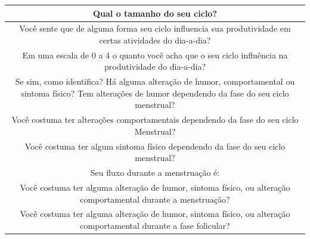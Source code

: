 \begin{table}[h]
\begin{tabular}{c}
        \midrule
        \begin{minipage} [t] {1\textwidth}  Qual o tamanho do seu ciclo? \end{minipage}\\
        \midrule
        \begin{minipage} [t] {1\textwidth}  Você sente que de alguma forma seu ciclo influencia sua produtividade em certas atividades do dia-a-dia? \end{minipage}\\
        \midrule
        \begin{minipage} [t] {1\textwidth}  Em uma escala de 0 a 4 o quanto você acha que o seu ciclo influência na produtividade do dia-a-dia? \end{minipage}\\
        \midrule
        \begin{minipage} [t] {1\textwidth} Se sim, como identifica? Há alguma alteração de humor, comportamental ou sintoma físico? Tem alterações de humor dependendo da fase do seu ciclo menstrual? \end{minipage}\\
        \midrule
        \begin{minipage} [t] {1\textwidth} Você costuma ter alterações comportamentais dependendo da fase do seu ciclo Menstrual? \end{minipage}\\
        \midrule
        \begin{minipage} [t] {1\textwidth} Você costuma ter algum sintoma físico dependendo da fase do seu ciclo menstrual? \end{minipage}\\
        \midrule
        \begin{minipage} [t] {1\textwidth} Seu fluxo durante a menstruação é:\end{minipage}\\
        \midrule
        \begin{minipage} [t] {1\textwidth} Você costuma ter alguma alteração de humor, sintoma físico, ou alteração comportamental durante a menstruação? \end{minipage}\\
        \midrule
        \begin{minipage} [t] {1\textwidth} Você costuma ter alguma alteração de humor, sintoma físico, ou alteração comportamental durante a fase folicular? \end{minipage}\\
        \midrule

\end{tabular}
\end{table}
